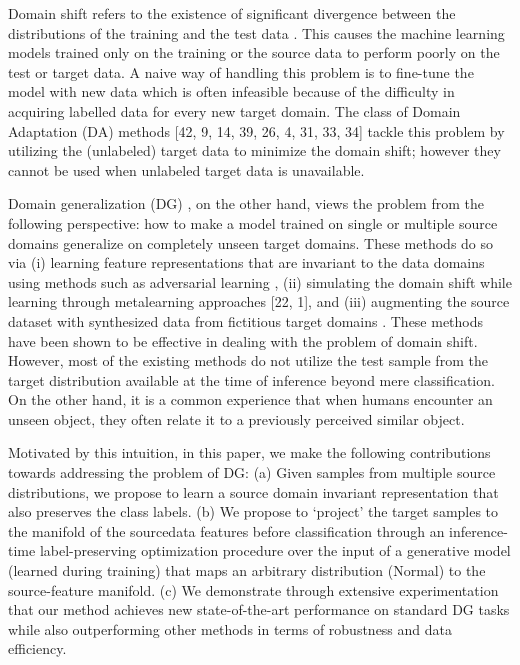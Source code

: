 \documentclass[review]{cvpr}
\begin{document}
Domain shift refers to the existence of significant divergence between the distributions of the training and the test
data \cite{Authors14b}. This causes the machine learning models trained
only on the training or the source data to perform poorly on
the test or target data. A naive way of handling this problem
is to fine-tune the model with new data which is often infeasible because of the difficulty in acquiring labelled data for
every new target domain. The class of Domain Adaptation
(DA) methods [42, 9, 14, 39, 26, 4, 31, 33, 34] tackle this
problem by utilizing the (unlabeled) target data to minimize
the domain shift; however they cannot be used when unlabeled target data is unavailable.\par
Domain generalization (DG) \cite{Alpher02,Alpher04,Authors1}, on
the other hand, views the problem from the following perspective: how to make a model trained on single or multiple source domains generalize on completely unseen target domains. These methods do so via (i) learning feature representations that are invariant to the data domains
using methods such as adversarial learning \cite{Alpher03, Authors1} , (ii)
simulating the domain shift while learning through metalearning approaches [22, 1], and (iii) augmenting the source
dataset with synthesized data from fictitious target domains
\cite{Authors2}. These methods have been shown to be effective in
dealing with the problem of domain shift. However, most
of the existing methods do not utilize the test sample from
the target distribution available at the time of inference beyond mere classification. On the other hand, it is a common
experience that when humans encounter an unseen object,
they often relate it to a previously perceived similar object. \par
Motivated by this intuition, in this paper, we make the
following contributions towards addressing the problem of
DG: (a) Given samples from multiple source distributions,
we propose to learn a source domain invariant representation that also preserves the class labels. (b) We propose to
‘project’ the target samples to the manifold of the sourcedata features before classification through an inference-time
label-preserving optimization procedure over the input of a
generative model (learned during training) that maps an arbitrary distribution (Normal) to the source-feature manifold.
(c) We demonstrate through extensive experimentation that
our method achieves new state-of-the-art performance on
standard DG tasks while also outperforming other methods
in terms of robustness and data efficiency.
\end{document}

